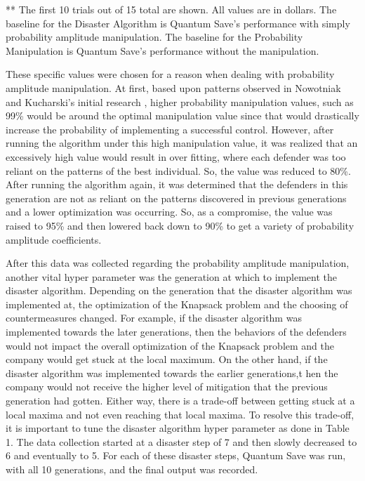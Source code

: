 {\footnotesize *** The first 10 trials out of 15 total are shown. All values are in dollars. The baseline for the Disaster Algorithm is Quantum Save's performance with simply probability amplitude manipulation. The baseline for the Probability Manipulation is Quantum Save's performance without the manipulation. \par}

\vspace{1mm}

These specific values were chosen for a reason when dealing with probability amplitude manipulation. At first, based upon patterns observed in Nowotniak and Kucharski's initial research \cite{nowotniak_higher-order_2014}, higher probability manipulation values, such as 99\% would be around the optimal manipulation value since that would drastically increase the probability of implementing a successful control. However, after running the algorithm under this high manipulation value, it was realized that an excessively high value would result in over fitting, where each defender was too reliant on the patterns of the best individual. So, the value was reduced to 80\%. After running the algorithm again, it was determined that the defenders in this generation are not as reliant on the patterns discovered in previous generations and a lower optimization was occurring. So, as a compromise, the value was raised to 95\% and then lowered back down to 90\% to get a variety of probability amplitude coefficients.

\vspace{1mm}

After this data was collected regarding the probability amplitude manipulation, another vital hyper parameter was the generation at which to implement the disaster algorithm. Depending on the generation that the disaster algorithm was implemented at, the optimization of the Knapsack problem and the choosing of countermeasures changed. For example, if the disaster algorithm was implemented towards the later generations, then the behaviors of the defenders would not impact the overall optimization of the Knapsack problem and the company would get stuck at the local maximum. On the other hand, if the disaster algorithm was implemented towards the earlier generations,t hen the company would not receive the higher level of mitigation that the previous generation had gotten. Either way, there is a trade-off between getting stuck at a local maxima and not even reaching that local maxima. To resolve this trade-off, it is important to tune the disaster algorithm hyper parameter as done in Table 1. The data collection started at a disaster step of 7 and then slowly decreased to 6 and eventually to 5. For each of these disaster steps, Quantum Save was run, with all 10 generations, and the final output was recorded.


